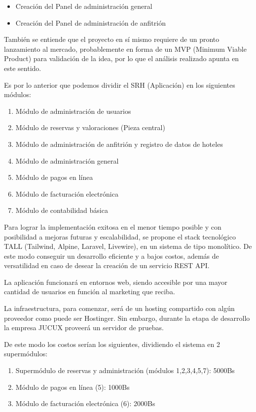 \begin{itemize}
    \item Creación del Panel de administración general
    \item Creación del Panel de administración de anfitrión
\end{itemize}

También se entiende que el proyecto en sí mismo requiere de un pronto lanzamiento al mercado, probablemente en forma de un MVP (Minimum Viable Product) para validación de la idea, por lo que el análisis realizado apunta en este sentido.

Es por lo anterior que podemos dividir el SRH (Aplicación) en los siguientes módulos:

\begin{enumerate}
    \item Módulo de administración de usuarios
    \item Módulo de reservas y valoraciones (Pieza central)
    \item Módulo de administración de anfitrión y registro de datos de hoteles
    \item Módulo de administración general
    \item Módulo de pagos en línea
    \item Módulo de facturación electrónica
    \item Módulo de contabilidad básica
\end{enumerate}

Para lograr la implementación exitosa en el menor tiempo posible y con posibilidad a mejoras futuras y escalabilidad, se propone el stack tecnológico TALL (Tailwind, Alpine, Laravel, Livewire), en un sistema de tipo monolítico. De este modo conseguir un desarrollo eficiente y a bajos costos, además de versatilidad en caso de desear la creación de un servicio REST API.

La aplicación funcionará en entornos web, siendo accesible por una mayor cantidad de usuarios en función al marketing que reciba.

La infraestructura, para comenzar, será de un hosting compartido con algún proveedor como puede ser Hostinger. Sin embargo, durante la etapa de desarrollo la empresa JUCUX proveerá un servidor de pruebas.

De este modo los costos serían los siguientes, dividiendo el sistema en 2 supermódulos:

\begin{enumerate}
    \item Supermódulo de reservas y administración (módulos 1,2,3,4,5,7): 5000Bs
    \item Módulo de pagos en línea (5): 1000Bs
    \item Módulo de facturación electrónica (6): 2000Bs
\end{enumerate}

